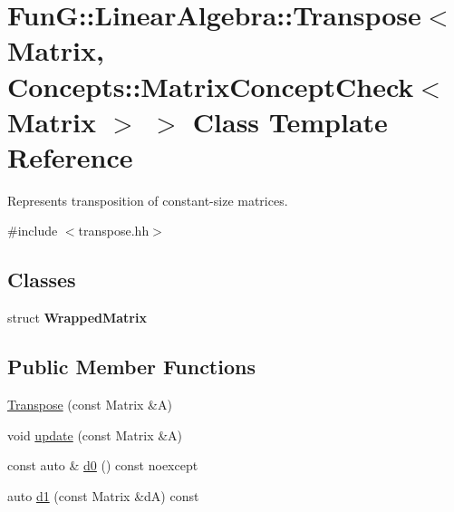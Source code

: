 \hypertarget{classFunG_1_1LinearAlgebra_1_1Transpose_3_01Matrix_00_01Concepts_1_1MatrixConceptCheck_3_01Matrix_01_4_01_4}{\section{\-Fun\-G\-:\-:\-Linear\-Algebra\-:\-:\-Transpose$<$ \-Matrix, \-Concepts\-:\-:\-Matrix\-Concept\-Check$<$ \-Matrix $>$ $>$ \-Class \-Template \-Reference}
\label{classFunG_1_1LinearAlgebra_1_1Transpose_3_01Matrix_00_01Concepts_1_1MatrixConceptCheck_3_01Matrix_01_4_01_4}
}


\-Represents transposition of constant-\/size matrices.  




{\ttfamily \#include $<$transpose.\-hh$>$}

\subsection*{\-Classes}
\begin{DoxyCompactItemize}
\item 
struct {\bfseries \-Wrapped\-Matrix}
\end{DoxyCompactItemize}
\subsection*{\-Public \-Member \-Functions}
\begin{DoxyCompactItemize}
\item 
\hyperlink{classFunG_1_1LinearAlgebra_1_1Transpose_3_01Matrix_00_01Concepts_1_1MatrixConceptCheck_3_01Matrix_01_4_01_4_adbcb05dc37fc93a30c3d131069b5cb98}{\-Transpose} (const \-Matrix \&\-A)
\item 
void \hyperlink{classFunG_1_1LinearAlgebra_1_1Transpose_3_01Matrix_00_01Concepts_1_1MatrixConceptCheck_3_01Matrix_01_4_01_4_abb53a9d48f7a4be92e6788a6d668bcfe}{update} (const \-Matrix \&\-A)
\item 
const auto \& \hyperlink{classFunG_1_1LinearAlgebra_1_1Transpose_3_01Matrix_00_01Concepts_1_1MatrixConceptCheck_3_01Matrix_01_4_01_4_afd43d1b0dbdb880c476fb66cbf239fb9}{d0} () const noexcept
\item 
auto \hyperlink{classFunG_1_1LinearAlgebra_1_1Transpose_3_01Matrix_00_01Concepts_1_1MatrixConceptCheck_3_01Matrix_01_4_01_4_a23a99c7b218fb61ae39c0e796dde050b}{d1} (const \-Matrix \&d\-A) const 
\end{DoxyCompactItemize}


